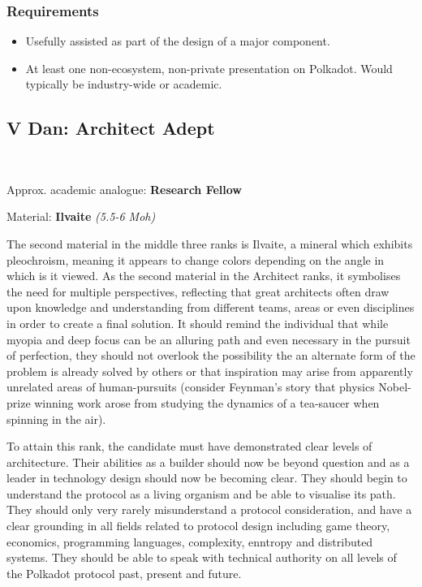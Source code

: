 \documentclass[9pt,oneside]{amsart}
\begin{document}
\subsubsection{Requirements}\label{requirements-3}

\begin{itemize}
\item Usefully assisted as part of the design of a major component.
\item At least one non-ecosystem, non-private presentation on Polkadot. Would typically be industry-wide or academic.
\end{itemize}

\subsection{V Dan: Architect Adept}\label{v-dan-architect-adept}~\\


Approx. academic analogue: \textbf{Research Fellow}

Material: \textbf{Ilvaite} \emph{(5.5-6 Moh)}

The second material in the middle three ranks is Ilvaite, a mineral which exhibits pleochroism, meaning it appears to change colors depending on the angle in which is it viewed. As the second material in the Architect ranks, it symbolises the need for multiple perspectives, reflecting that great architects often draw upon knowledge and understanding from different teams, areas or even disciplines in order to create a final solution. It should remind the individual that while myopia and deep focus can be an alluring path and even necessary in the pursuit of perfection, they should not overlook the possibility the an alternate form of the problem is already solved by others or that inspiration may arise from apparently unrelated areas of human-pursuits (consider Feynman's story that physics Nobel-prize winning work arose from studying the dynamics of a tea-saucer when spinning in the air).

To attain this rank, the candidate must have demonstrated clear levels of architecture. Their abilities as a builder should now be beyond question and as a leader in technology design should now be becoming clear. They should begin to understand the protocol as a living organism and be able to visualise its path. They should only very rarely misunderstand a protocol consideration, and have a clear grounding in all fields related to protocol design including game theory, economics, programming languages, complexity, enntropy and distributed systems. They should be able to speak with technical authority on all levels of the Polkadot protocol past, present and future.
\end{document}
